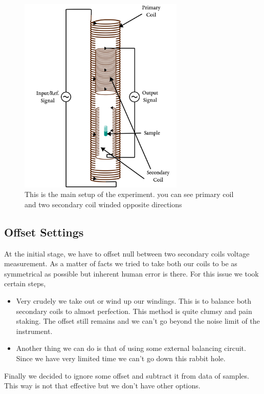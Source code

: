 \begin{figure}[hbt!]
  \centering\includegraphics[width=0.7\textwidth]{coils.png}
  \caption{This is the main setup of the experiment. you can see primary coil and two secondary coil winded opposite directions}
  \label{fig:assembly}
\end{figure}

\subsection{Offset Settings}



At the initial stage, we have to offset null between two secondary coils voltage measurement. As a matter of facts we tried to take both our coils to be as symmetrical as possible but inherent human error is there. For this issue we took certain steps,

  
\vskip1cm
\begin{itemize}
\item Very crudely we take out or wind up our windings. This is to balance both secondary coils to almost perfection. This method is quite clumsy and pain staking. The offset still remains and we can’t go beyond the noise limit of the instrument.
\vskip1cm
\item Another thing we can do is that of using some external balancing circuit. Since we have very limited time we can’t go down this rabbit hole.
\end{itemize}
\vskip1cm
Finally we decided to ignore some offset and subtract it from data of samples. This way is not that effective but we don’t have other options.


